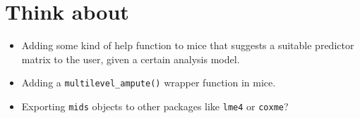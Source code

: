 \documentclass[
]{jss}
\begin{document}
\hypertarget{think-about}{%
\section{Think about}\label{think-about}}

\begin{itemize}
\item
  Adding some kind of help function to mice that suggests a suitable
  predictor matrix to the user, given a certain analysis model.
\item
  Adding a \texttt{multilevel\_ampute()} wrapper function in mice.
\item
  Exporting \texttt{mids} objects to other packages like \texttt{lme4}
  or \texttt{coxme}?
\end{itemize}

\renewcommand\refname{References}

\end{document}
